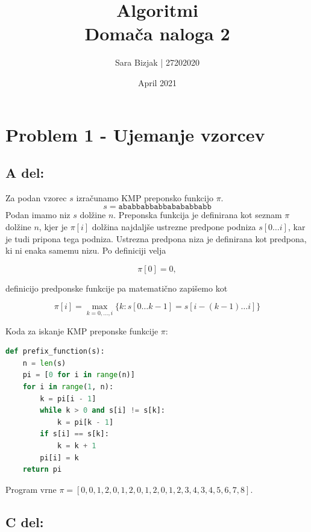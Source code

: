 \documentclass[a4paper,11pt]{article}
\title{Algoritmi \\
\textbf{Domača naloga 2} }
\author{Sara Bizjak  |  27202020}
\date{April 2021}
\begin{document}
\maketitle


\section*{Problem 1 - Ujemanje vzorcev}


\subsection*{A del:}

Za podan vzorec $s$ izračunamo KMP preponsko funkcijo $\pi$.
$$s = \texttt{ababbabbabbabababbabb} $$
Podan imamo niz $s$ dolžine $n$. 
Preponska funkcija je definirana kot seznam $\pi$ dolžine $n$, kjer je $\pi[i]$ dolžina najdaljše ustrezne predpone podniza $s[0 \ldots i]$, kar je tudi pripona tega podniza.
Ustrezna predpona niza je definirana kot predpona, ki ni enaka samemu nizu. Po definiciji velja

$$
    \pi [0] = 0,
$$

\noindent
definicijo predponske funkcije pa matematično zapišemo kot

$$
    \pi [i] = \max_{k = 0, \ldots, i} \{ k : s [ 0 \ldots k - 1 ] = s [ i - (k - 1) \ldots i ] \}
$$

\noindent
Koda za iskanje KMP preponske funkcije $\pi$:

\begin{lstlisting}[language=Python]
def prefix_function(s):
    n = len(s)
    pi = [0 for i in range(n)]
    for i in range(1, n):
        k = pi[i - 1]
        while k > 0 and s[i] != s[k]:
            k = pi[k - 1]
        if s[i] == s[k]:
            k = k + 1
        pi[i] = k
    return pi
\end{lstlisting}

\noindent
Program vrne \texttt{$\pi = [0, 0, 1, 2, 0, 1, 2, 0, 1, 2, 0, 1, 2, 3, 4, 3, 4, 5, 6, 7, 8]$}.


\subsection*{C del:}
\end{document}
